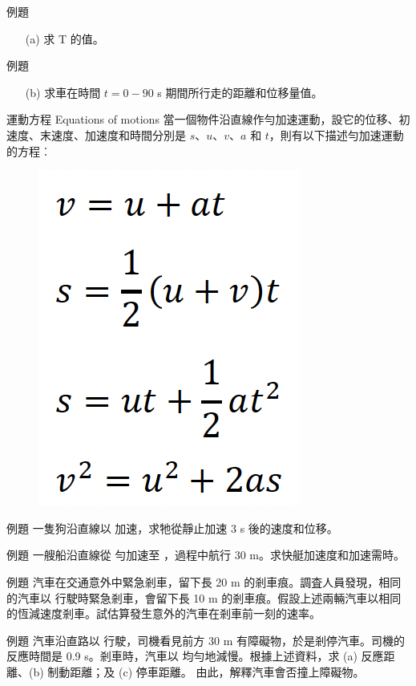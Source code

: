 \documentclass[beamer=true]{standalone}
\begin{document}
\begin{frame}[t]{例題}
    \begin{itemize}
        \item [(a)] 求 T 的值。
    \end{itemize}
\end{frame}
\begin{frame}[t]{例題}
    \begin{itemize}
        \item [(b)] 求車在時間 $t = 0-90$ s 期間所行走的距離和位移量值。
    \end{itemize}
\end{frame}

\begin{frame}{運動方程 Equations of motions}
    當一個物件沿直線作勻加速運動，設它的位移、初速度、末速度、加速度和時間分別是 $\mathit{s}$、$\mathit{u}$、$\mathit{v}$、$\mathit{a}$ 和 $\mathit{t}$，則有以下描述勻加速運動的方程︰
    \begin{figure}[h!]
        \centering
        \includegraphics[width=.2\textwidth]{../../assets/6d3f21f0.png}
    \end{figure}
\end{frame}

\begin{frame}[t]{例題}
    一隻狗沿直線以  加速，求牠從靜止加速 3 s 後的速度和位移。
\end{frame}
\begin{frame}[t]{例題}
    一艘船沿直線從  勻加速至 ，過程中航行 30 m。求快艇加速度和加速需時。
\end{frame}
\begin{frame}[t]{例題}
    汽車在交通意外中緊急剎車，留下長 20 m 的剎車痕。調査人員發現，相同的汽車以  行駛時緊急剎車，會留下長 10 m 的剎車痕。假設上述兩輛汽車以相同的恆減速度剎車。試估算發生意外的汽車在剎車前一刻的速率。
\end{frame}
\begin{frame}[t]{例題}
    汽車沿直路以  行駛，司機看見前方 30 m 有障礙物，於是剎停汽車。司機的反應時間是 0.9 s。剎車時，汽車以  均勻地減慢。根據上述資料，求 (a) 反應距離、(b) 制動距離；及 (c) 停車距離。 由此，解釋汽車會否撞上障礙物。
\end{frame}
\end{document}
